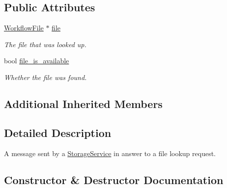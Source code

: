 \subsection*{Public Attributes}
\begin{DoxyCompactItemize}
\item 
\mbox{\label{classwrench_1_1_storage_service_file_lookup_answer_message_aecfa1c0fd28d996275e93ad80becbeb8}} 
\hyperlink{classwrench_1_1_workflow_file}{Workflow\+File} $\ast$ \hyperlink{classwrench_1_1_storage_service_file_lookup_answer_message_aecfa1c0fd28d996275e93ad80becbeb8}{file}
\begin{DoxyCompactList}\small\item\em The file that was looked up. \end{DoxyCompactList}\item 
\mbox{\label{classwrench_1_1_storage_service_file_lookup_answer_message_a707266a9904d1cea4b548a290c0ca432}} 
bool \hyperlink{classwrench_1_1_storage_service_file_lookup_answer_message_a707266a9904d1cea4b548a290c0ca432}{file\+\_\+is\+\_\+available}
\begin{DoxyCompactList}\small\item\em Whether the file was found. \end{DoxyCompactList}\end{DoxyCompactItemize}
\subsection*{Additional Inherited Members}


\subsection{Detailed Description}
A message sent by a \hyperlink{classwrench_1_1_storage_service}{Storage\+Service} in answer to a file lookup request. 

\subsection{Constructor \& Destructor Documentation}
\mbox{\label{classwrench_1_1_storage_service_file_lookup_answer_message_aaff2303ab4bc3b2859a948a55a43ea1f}} 
